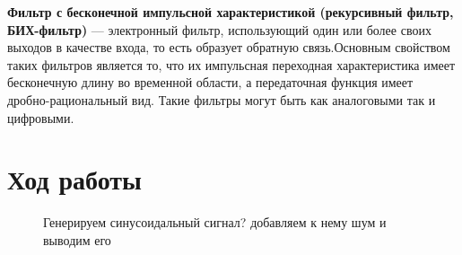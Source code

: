 \documentclass[12pt,a4paper]{scrartcl}
\begin{document}
\textbf{Фильтр с бесконечной импульсной характеристикой (рекурсивный фильтр, БИХ-фильтр)} — электронный фильтр, использующий один или более своих выходов в качестве входа, то есть образует обратную связь.Основным свойством таких фильтров является то, что их импульсная переходная характеристика имеет бесконечную длину во временной области, а передаточная функция имеет дробно-рациональный вид. Такие фильтры могут быть как аналоговыми так и цифровыми. 

\newpage

\section{Ход работы}
\label{sec:work}

\begin{figure}[h!]
\caption{Генерируем синусоидальный сигнал? добавляем к нему шум и выводим его}
\end{figure}
\end{document}
